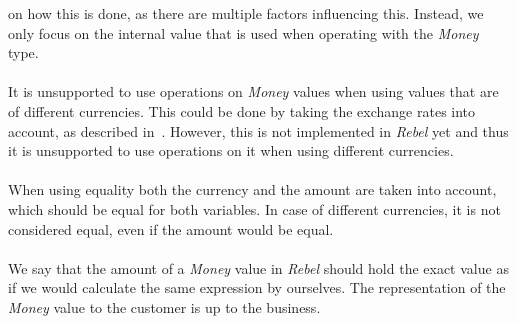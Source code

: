 on how this is done, as there are multiple factors influencing this. Instead, we
only focus on the internal value that is used when operating with the
\textit{Money} type.\\
\\
It is unsupported to use operations on \textit{Money} values when using values
that are of different currencies. This could be done by taking the exchange
rates into account, as described in~\cite{fowler2002patterns}. However, this is
not implemented in \textit{Rebel} yet and thus it is unsupported to use
operations on it when using different currencies.\\
\\
When using equality both the currency and the amount are taken into account,
which should be equal for both variables. In case of different currencies, it is
not considered equal, even if the amount would be equal.\\
\\
We say that the amount of a \textit{Money} value in \textit{Rebel} should hold
the exact value as if we would calculate the same expression by ourselves. The
representation of the \textit{Money} value to the customer is up to the
business.

